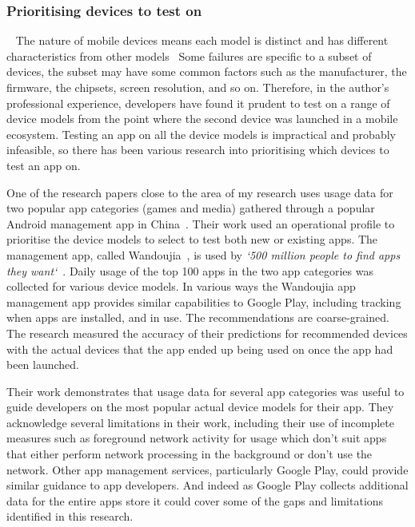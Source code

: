 \subsubsection{Prioritising devices to test on}~\label{rw-prioritising-devices-to-test-on-topic}
The nature of mobile devices means each model is distinct and has different characteristics from other models~ Some failures are specific to a subset of devices, the subset may have some common factors such as the manufacturer, the firmware, the chipsets, screen resolution, and so on. Therefore, in the author's professional experience, developers have found it prudent to test on a range of device models from the point where the second device was launched in a mobile ecosystem. Testing an app on all the device models is impractical and probably infeasible, so there has been various research into prioritising which devices to test an app on.

One of the research papers close to the area of my research uses usage data for two popular app categories (games and media) gathered through a popular Android management app in China~. Their work used an operational profile to prioritise the device models to select to test both new or existing apps. The management app, called Wandoujia~, is used by \emph{`500 million people to find apps they want`}~. Daily usage of the top 100 apps in the two app categories was collected for various device models. In various ways the Wandoujia app management app provides similar capabilities to Google Play, including tracking when apps are installed, and in use. The recommendations are coarse-grained. The research measured the accuracy of their predictions for recommended devices with the actual devices that the app ended up being used on once the app had been launched. 

Their work demonstrates that usage data for several app categories was useful to guide developers on the most popular actual device models for their app. They acknowledge several limitations in their work, including their use of incomplete measures such as foreground network activity for usage which don't suit apps that either perform network processing in the background or don't use the network. Other app management services, particularly Google Play, could provide similar guidance to app developers. And indeed as Google Play collects additional data for the entire apps store it could cover some of the gaps and limitations identified in this research.

